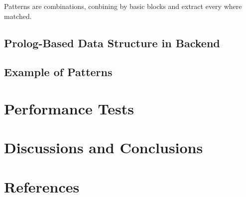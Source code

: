 \documentclass[conference]{IEEEtran}
\begin{document}
Patterns are combinations, conbining by basic blocks and extract every where matched.
\subsection{Prolog-Based Data Structure in Backend}

\subsection{Example of Patterns}

\section{Performance Tests}

\section{Discussions and Conclusions}






\section*{References}





\end{document}
